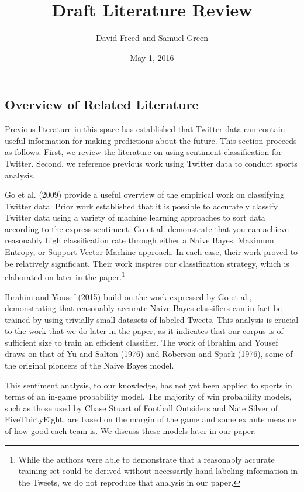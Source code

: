 \documentclass[12pt]{article}
\begin{document}
\setcounter{page}{1}
\begin{doublespacing}

\title{Draft Literature Review}
\author{David Freed and Samuel Green}
\date{May 1, 2016}
\maketitle

\section{Overview of Related Literature}

Previous literature in this space has established that Twitter data can contain useful information for making predictions about the future. This section proceeds as follows. First, we review the literature on using sentiment classification for Twitter. Second, we reference previous work using Twitter data to conduct sports analysis.

Go et al. (2009) provide a useful overview of the empirical work on classifying Twitter data. Prior work established that it is possible to accurately classify Twitter data using a variety of machine learning approaches to sort data according to the express sentiment. Go et al. demonstrate that you can achieve reasonably high classification rate through either a Naive Bayes, Maximum Entropy, or Support Vector Machine approach. In each case, their work proved to be relatively significant. Their work inspires our classification strategy, which is elaborated on later in the paper.\footnote{While the authors were able to demonstrate that a reasonably accurate training set could be derived without necessarily hand-labeling information in the Tweets, we do not reproduce that analysis in our paper.}

Ibrahim and Yousef (2015) build on the work expressed by Go et al., demonstrating that reasonably accurate Naive Bayes classifiers can in fact be trained by using trivially small datasets of labeled Tweets. This analysis is crucial to the work that we do later in the paper, as it indicates that our corpus is of sufficient size to train an efficient classifier. The work of Ibrahim and Yousef draws on that of Yu and Salton (1976) and Roberson and Spark (1976), some of the original pioneers of the Naive Bayes model.   

This sentiment analysis, to our knowledge, has not yet been applied to sports in terms of an in-game probability model. The majority of win probability models, such as those used by Chase Stuart of Football Outsiders and Nate Silver of FiveThirtyEight, are based on the margin of the game and some ex ante measure of how good each team is. We discuss these models later in our paper. 


\end{doublespacing}
\end{document}
